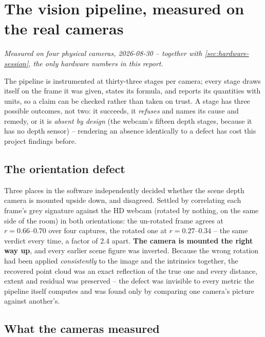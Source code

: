 \chapter{The vision pipeline, measured on the real cameras}
\label{ch:vision}

\emph{Measured on four physical cameras, 2026-08-30 -- together with
\cref{sec:hardware-session}, the only hardware numbers in this report.}

The pipeline is instrumented at thirty-three stages per camera; every stage
draws itself on the frame it was given, states its formula, and reports its
quantities with units, so a claim can be checked rather than taken on trust.
A stage has three possible outcomes, not two: it succeeds, it \emph{refuses}
and names its cause and remedy, or it is \emph{absent by design} (the
webcam's fifteen depth stages, because it has no depth sensor) -- rendering
an absence identically to a defect has cost this project findings before.

\section{The orientation defect}
\label{sec:orientation}

Three places in the software independently decided whether the scene depth
camera is mounted upside down, and disagreed. Settled by correlating each
frame's grey signature against the HD webcam (rotated by nothing, on the
same side of the room) in both orientations: the un-rotated frame agrees at
$r=\numrange{0.66}{0.70}$ over four captures, the rotated one at
$r=\numrange{0.27}{0.34}$ -- the same verdict every time, a factor of 2.4
apart. \textbf{The camera is mounted the right way up}, and every earlier
scene figure was inverted. Because the wrong rotation had been applied
\emph{consistently} to the image and the intrinsics together, the recovered
point cloud was an exact reflection of the true one and every distance,
extent and residual was preserved -- the defect was invisible to every
metric the pipeline itself computes and was found only by comparing one
camera's picture against another's.

\section{What the cameras measured}

